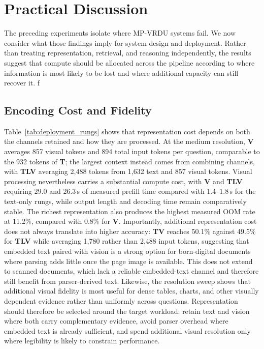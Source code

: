 \section{Practical Discussion}
\label{sec:practical_discussion}

The preceding experiments isolate where MP-VRDU systems fail. We now consider what those findings imply for system design and deployment. Rather than treating representation, retrieval, and reasoning independently, the results suggest that compute should be allocated across the pipeline according to where information is most likely to be lost and where additional capacity can still recover it.
f
\subsection{Encoding Cost and Fidelity}
\label{sec:discussion_representation}



Table~\ref{tab:deployment_rungs} shows that representation cost depends on both the channels retained and how they are processed. At the medium resolution, \textbf{V} averages 857 visual tokens and 894 total input tokens per question, comparable to the 932 tokens of \textbf{T}; the largest context instead comes from combining channels, with \textbf{TLV} averaging 2,488 tokens from 1,632 text and 857 visual tokens. Visual processing nevertheless carries a substantial compute cost, with \textbf{V} and \textbf{TLV} requiring 29.0 and 26.3\,s of measured prefill time compared with 1.4--1.8\,s for the text-only rungs, while output length and decoding time remain comparatively stable. The richest representation also produces the highest measured OOM rate at 11.2\%, compared with 0.8\% for \textbf{V}. Importantly, additional representation cost does not always translate into higher accuracy: \textbf{TV} reaches 50.1\% against 49.5\% for \textbf{TLV} while averaging 1,780 rather than 2,488 input tokens, suggesting that embedded text paired with vision is a strong option for born-digital documents where parsing adds little once the page image is available. This does not extend to scanned documents, which lack a reliable embedded-text channel and therefore still benefit from parser-derived text. Likewise, the resolution sweep shows that additional visual fidelity is most useful for dense tables, charts, and other visually dependent evidence rather than uniformly across questions. Representation should therefore be selected around the target workload: retain text and vision where both carry complementary evidence, avoid parser overhead where embedded text is already sufficient, and spend additional visual resolution only where legibility is likely to constrain performance.

